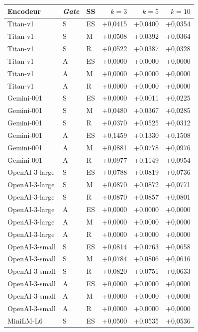 \documentclass[a4paper,10pt]{article}
\begin{document}
\begin{table}[p]
\centering
\small
\begin{tabular}{lllrrr}
\toprule
Encodeur & \textit{Gate} & SS & $k=3$ & $k=5$ & $k=10$ \\
\midrule
Titan-v1 & S & ES & +0,0415 & +0,0400 & +0,0354 \\
Titan-v1 & S & M & +0,0508 & +0,0392 & +0,0364 \\
Titan-v1 & S & R & +0,0522 & +0,0387 & +0,0328 \\
Titan-v1 & A & ES & +0,0000 & +0,0000 & +0,0000 \\
Titan-v1 & A & M & +0,0000 & +0,0000 & +0,0000 \\
Titan-v1 & A & R & +0,0000 & +0,0000 & +0,0000 \\
\midrule
Gemini-001 & S & ES & +0,0000 & +0,0011 & +0,0225 \\
Gemini-001 & S & M & +0,0480 & +0,0367 & +0,0285 \\
Gemini-001 & S & R & +0,0370 & +0,0525 & +0,0312 \\
Gemini-001 & A & ES & +0,1459 & +0,1330 & +0,1508 \\
Gemini-001 & A & M & +0,0881 & +0,0778 & +0,0976 \\
Gemini-001 & A & R & +0,0977 & +0,1149 & +0,0954 \\
\midrule
OpenAI-3-large & S & ES & +0,0788 & +0,0819 & +0,0736 \\
OpenAI-3-large & S & M & +0,0870 & +0,0872 & +0,0771 \\
OpenAI-3-large & S & R & +0,0870 & +0,0857 & +0,0801 \\
OpenAI-3-large & A & ES & +0,0000 & +0,0000 & +0,0000 \\
OpenAI-3-large & A & M & +0,0000 & +0,0000 & +0,0000 \\
OpenAI-3-large & A & R & +0,0000 & +0,0000 & +0,0000 \\
\midrule
OpenAI-3-small & S & ES & +0,0814 & +0,0763 & +0,0658 \\
OpenAI-3-small & S & M & +0,0784 & +0,0806 & +0,0616 \\
OpenAI-3-small & S & R & +0,0820 & +0,0751 & +0,0633 \\
OpenAI-3-small & A & ES & +0,0000 & +0,0000 & +0,0000 \\
OpenAI-3-small & A & M & +0,0000 & +0,0000 & +0,0000 \\
OpenAI-3-small & A & R & +0,0000 & +0,0000 & +0,0000 \\
\midrule
MiniLM-L6 & S & ES & +0,0500 & +0,0535 & +0,0536 \\

\end{tabular}
\end{table}
\end{document}
